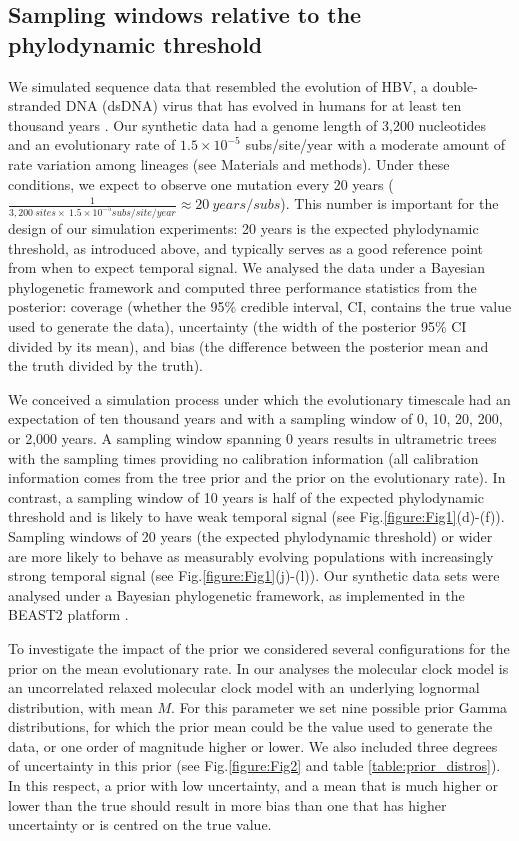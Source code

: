 \documentclass[11pt]{article}
\begin{document}
\subsection{Sampling windows relative to the phylodynamic threshold}
We simulated sequence data that resembled the evolution of HBV, a double-stranded DNA (dsDNA) virus that has evolved in humans for at least ten thousand years \citep{kocher2021ten}. Our synthetic data had a genome length of 3,200 nucleotides and an evolutionary rate of $1.5\times10^{-5}$ subs/site/year \citep{kocher2021ten, muhlemann2018ancient} with a moderate amount of rate variation among lineages (see Materials and methods). Under these conditions, we expect to observe one mutation every 20 years ($\frac{1}{3,200\ sites \times\ 1.5\times10^{-5}subs/site/year}\approx20\ years/subs$). This number is important for the design of our simulation experiments: 20 years is the expected phylodynamic threshold, as introduced above, and typically serves as a good reference point from when to expect temporal signal. We analysed the data under a Bayesian phylogenetic framework and computed three performance statistics from the posterior: coverage (whether the 95\% credible interval, CI, contains the true value used to generate the data), uncertainty (the width of the posterior 95\% CI divided by its mean), and bias (the difference between the posterior mean and the truth divided by the truth).

We conceived a simulation process under which the evolutionary timescale had an expectation of ten thousand years and with a sampling window of 0, 10, 20, 200, or 2,000 years. A sampling window spanning 0 years results in ultrametric trees with the sampling times providing no calibration information (all calibration information comes from the tree prior and the prior on the evolutionary rate). In contrast, a sampling window of 10 years is half of the expected phylodynamic threshold and is likely to have weak temporal signal (see Fig.\ref{figure:Fig1}(d)-(f)). Sampling windows of 20 years (the expected phylodynamic threshold) or wider are more likely to behave as measurably evolving populations with increasingly strong temporal signal (see Fig.\ref{figure:Fig1}(j)-(l)). Our synthetic data sets were analysed under a Bayesian phylogenetic framework, as implemented in the BEAST2 platform \citep{bouckaert2019beast}.

To investigate the impact of the prior we considered several configurations for the prior on the mean evolutionary rate. In our analyses the molecular clock model is an uncorrelated relaxed molecular clock model with an underlying lognormal distribution, with mean $M$. For this parameter we set nine possible prior Gamma distributions, for which the prior mean could be the value used to generate the data, or one order of magnitude higher or lower. We also included three degrees of uncertainty in this prior (see Fig.\ref{figure:Fig2} and table \ref{table:prior_distros}). In this respect, a prior with low uncertainty, and a mean that is much higher or lower than the true should result in more bias than one that has higher uncertainty or is centred on the true value.
\end{document}
